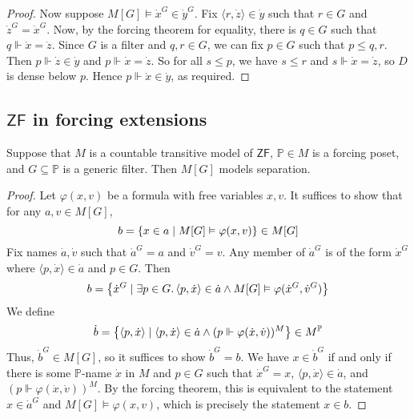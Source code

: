 \begin{proof}
    Now suppose \( M[G] \vDash \dot x^G \in \dot y^G \).
    Fix \( \langle r, \dot z \rangle \in \dot y \) such that \( r \in G \) and \( \dot z^G = \dot x^G \).
    Now, by the forcing theorem for equality, there is \( q \in G \) such that \( q \Vdash \dot x = \dot z \).
    Since \( G \) is a filter and \( q, r \in G \), we can fix \( p \in G \) such that \( p \leq q, r \).
    Then \( p \Vdash \dot z \in \dot y \) and \( p \Vdash \dot x = \dot z \).
    So for all \( s \leq p \), we have \( s \leq r \) and \( s \Vdash \dot x = \dot z \), so \( D \) is dense below \( p \).
    Hence \( p \Vdash \dot x \in \dot y \), as required.
\end{proof}

\subsection{\texorpdfstring{\( \mathsf{ZF} \)}{ZF} in forcing extensions}
\begin{lemma}
    Suppose that \( M \) is a countable transitive model of \( \mathsf{ZF} \), \( \mathbb P \in M \) is a forcing poset, and \( G \subseteq \mathbb P \) is a generic filter.
    Then \( M[G] \) models separation.
\end{lemma}
\begin{proof}
    Let \( \varphi(x, v) \) be a formula with free variables \( x, v \).
    It suffices to show that for any \( a, v \in M[G] \),
    \[ b = \qty{x \in a \mid M[G] \vDash \varphi(x, v)} \in M[G] \]
    Fix names \( \dot a, \dot v \) such that \( \dot a^G = a \) and \( \dot v^G = v \).
    Any member of \( \dot a^G \) is of the form \( \dot x^G \) where \( \langle p, \dot x \rangle \in \dot a \) and \( p \in G \).
    Then
    \[ b = \qty{\dot x^G \mid \exists p \in G.\, \langle p, \dot x \rangle \in \dot a \wedge M[G] \vDash \varphi(\dot x^G, \dot v^G)} \]
    We define
    \[ \dot b = \qty{\langle p, \dot x \rangle \mid \langle p, \dot x \rangle \in \dot a \wedge (p \Vdash \varphi(\dot x, \dot v))^M} \in M^{\mathbb P} \]
    Thus, \( \dot b^G \in M[G] \), so it suffices to show \( \dot b^G = b \).
    We have \( x \in \dot b^G \) if and only if there is some \( \mathbb P \)-name \( \dot x \) in \( M \) and \( p \in G \) such that \( \dot x^G = x \), \( \langle p, \dot x \rangle \in \dot a \), and \( (p \Vdash \varphi(\dot x, \dot v))^M \).
    By the forcing theorem, this is equivalent to the statement \( x \in \dot a^G \) and \( M[G] \vDash \varphi(x, v) \), which is precisely the statement \( x \in b \).
\end{proof}
